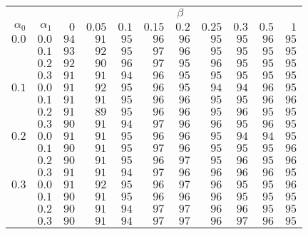 \begin{tabular}{rr|rrrrrrrrr}
\hline\hline
 && \multicolumn{9}{c}{$\beta$}\\
 $\alpha_0$ & $\alpha_1$ & $0$ & $0.05$ & $0.1$ & $0.15$ & $0.2$ & $0.25$ & $0.3$ & $0.5$ & $1$ \\ 
 \hline
$0.0$ & $0.0$ & $94$ & $91$ & $95$ & $96$ & $96$ & $95$ & $95$ & $96$ & $95$\\ 
 & $0.1$ & $93$ & $92$ & $95$ & $97$ & $96$ & $95$ & $95$ & $95$ & $95$\\ 
 & $0.2$ & $92$ & $90$ & $96$ & $97$ & $95$ & $96$ & $95$ & $95$ & $95$\\ 
 & $0.3$ & $91$ & $91$ & $94$ & $96$ & $95$ & $95$ & $95$ & $95$ & $95$\\ 
\hline 
 $0.1$ & $0.0$ & $91$ & $92$ & $95$ & $96$ & $95$ & $94$ & $94$ & $96$ & $95$\\ 
 & $0.1$ & $91$ & $91$ & $95$ & $96$ & $96$ & $95$ & $95$ & $96$ & $96$\\ 
 & $0.2$ & $91$ & $89$ & $95$ & $96$ & $96$ & $95$ & $96$ & $95$ & $95$\\ 
 & $0.3$ & $90$ & $91$ & $94$ & $97$ & $96$ & $96$ & $95$ & $96$ & $95$\\ 
\hline 
 $0.2$ & $0.0$ & $91$ & $91$ & $95$ & $96$ & $96$ & $95$ & $94$ & $94$ & $95$\\ 
 & $0.1$ & $90$ & $91$ & $95$ & $97$ & $96$ & $95$ & $95$ & $95$ & $96$\\ 
 & $0.2$ & $90$ & $91$ & $95$ & $96$ & $97$ & $95$ & $96$ & $95$ & $96$\\ 
 & $0.3$ & $91$ & $91$ & $94$ & $97$ & $96$ & $96$ & $96$ & $96$ & $95$\\ 
\hline 
 $0.3$ & $0.0$ & $91$ & $92$ & $95$ & $96$ & $97$ & $96$ & $95$ & $95$ & $96$\\ 
 & $0.1$ & $90$ & $91$ & $95$ & $96$ & $96$ & $96$ & $95$ & $95$ & $95$\\ 
 & $0.2$ & $90$ & $91$ & $94$ & $97$ & $97$ & $96$ & $96$ & $95$ & $95$\\ 
 & $0.3$ & $90$ & $91$ & $94$ & $97$ & $97$ & $96$ & $97$ & $96$ & $95$\\ 
 \hline 
 \end{tabular}